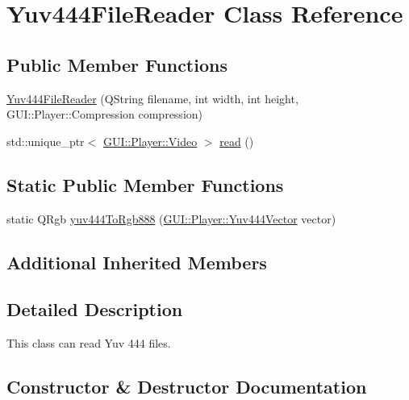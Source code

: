 \hypertarget{classGUI_1_1Player_1_1Yuv444FileReader}{}\section{Yuv444\+File\+Reader Class Reference}
\label{classGUI_1_1Player_1_1Yuv444FileReader}
\subsection*{Public Member Functions}
\begin{DoxyCompactItemize}
\item 
\hyperlink{classGUI_1_1Player_1_1Yuv444FileReader_aa532de3fc5d3c1de46df499edd669e03}{Yuv444\+File\+Reader} (Q\+String filename, int width, int height, G\+U\+I\+::\+Player\+::\+Compression compression)
\item 
std\+::unique\+\_\+ptr$<$ \hyperlink{classGUI_1_1Player_1_1Video}{G\+U\+I\+::\+Player\+::\+Video} $>$ \hyperlink{classGUI_1_1Player_1_1Yuv444FileReader_a796f80ad40ecc8941c49cd734ddeeae9}{read} ()
\end{DoxyCompactItemize}
\subsection*{Static Public Member Functions}
\begin{DoxyCompactItemize}
\item 
static Q\+Rgb \hyperlink{classGUI_1_1Player_1_1Yuv444FileReader_a94aceb3b427f20f116c769d65d4a0d10}{yuv444\+To\+Rgb888} (\hyperlink{classGUI_1_1Player_1_1Yuv444Vector}{G\+U\+I\+::\+Player\+::\+Yuv444\+Vector} vector)
\end{DoxyCompactItemize}
\subsection*{Additional Inherited Members}


\subsection{Detailed Description}
This class can read Yuv 444 files. 

\subsection{Constructor \& Destructor Documentation}
\hypertarget{classGUI_1_1Player_1_1Yuv444FileReader_aa532de3fc5d3c1de46df499edd669e03}{}

